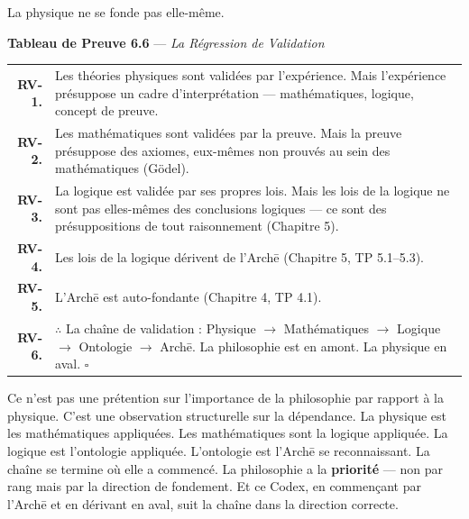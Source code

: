 \documentclass[10pt, openany, oneside]{book}
\renewcommand{\footnotesize}{\fontsize{8.5}{11}\selectfont}
\begin{document}
La physique ne se fonde pas elle-même.

\vspace{0.5em}

\textbf{Tableau de Preuve 6.6} --- \textit{La Régression de Validation}

\vspace{0.5em}

{\footnotesize
\noindent\begin{tabular}{r p{}}
\textbf{RV-1.} & Les théories physiques sont validées par l'expérience. Mais l'expérience présuppose un cadre d'interprétation --- mathématiques, logique, concept de preuve. \\[0.3em]
\textbf{RV-2.} & Les mathématiques sont validées par la preuve. Mais la preuve présuppose des axiomes, eux-mêmes non prouvés au sein des mathématiques (Gödel). \\[0.3em]
\textbf{RV-3.} & La logique est validée par ses propres lois. Mais les lois de la logique ne sont pas elles-mêmes des conclusions logiques --- ce sont des présuppositions de tout raisonnement (Chapitre 5). \\[0.3em]
\textbf{RV-4.} & Les lois de la logique dérivent de l'Arch\={e} (Chapitre 5, TP 5.1--5.3). \\[0.3em]
\textbf{RV-5.} & L'Arch\={e} est auto-fondante (Chapitre 4, TP 4.1). \\[0.3em]
\textbf{RV-6.} & $\therefore$ La chaîne de validation : Physique $\to$ Mathématiques $\to$ Logique $\to$ Ontologie $\to$ Arch\={e}. La philosophie est en amont. La physique en aval. $\square$ \\[0.3em]
\end{tabular}
}

Ce n'est pas une prétention sur l'importance de la philosophie par rapport à la physique. C'est une observation structurelle sur la dépendance. La physique est les mathématiques appliquées. Les mathématiques sont la logique appliquée. La logique est l'ontologie appliquée. L'ontologie est l'Arch\={e} se reconnaissant. La chaîne se termine où elle a commencé. La philosophie a la \textbf{priorité} --- non par rang mais par la direction de fondement. Et ce Codex, en commençant par l'Arch\={e} et en dérivant en aval, suit la chaîne dans la direction correcte.

\vspace{1.5em}

\end{document}
